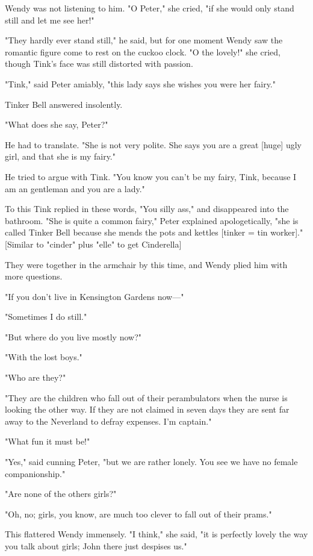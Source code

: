 Wendy was not listening to him. "O Peter," she cried, "if she would only
stand still and let me see her!"


"They hardly ever stand still," he said, but for one moment Wendy saw the
romantic figure come to rest on the cuckoo clock. "O the lovely!" she
cried, though Tink's face was still distorted with passion.


"Tink," said Peter amiably, "this lady says she wishes you were her
fairy."


Tinker Bell answered insolently.


"What does she say, Peter?"


He had to translate. "She is not very polite. She says you are a great
[huge] ugly girl, and that she is my fairy."


He tried to argue with Tink. "You know you can't be my fairy, Tink,
because I am an gentleman and you are a lady."


To this Tink replied in these words, "You silly ass," and disappeared into
the bathroom. "She is quite a common fairy," Peter explained
apologetically, "she is called Tinker Bell because she mends the pots and
kettles [tinker = tin worker]." [Similar to "cinder" plus "elle" to get
Cinderella]


They were together in the armchair by this time, and Wendy plied him with
more questions.


"If you don't live in Kensington Gardens now—"


"Sometimes I do still."


"But where do you live mostly now?"


"With the lost boys."


"Who are they?"


"They are the children who fall out of their perambulators when the nurse
is looking the other way. If they are not claimed in seven days they are
sent far away to the Neverland to defray expenses. I'm captain."


"What fun it must be!"


"Yes," said cunning Peter, "but we are rather lonely. You see we have no
female companionship."


"Are none of the others girls?"


"Oh, no; girls, you know, are much too clever to fall out of their prams."


This flattered Wendy immensely. "I think," she said, "it is perfectly
lovely the way you talk about girls; John there just despises us."


